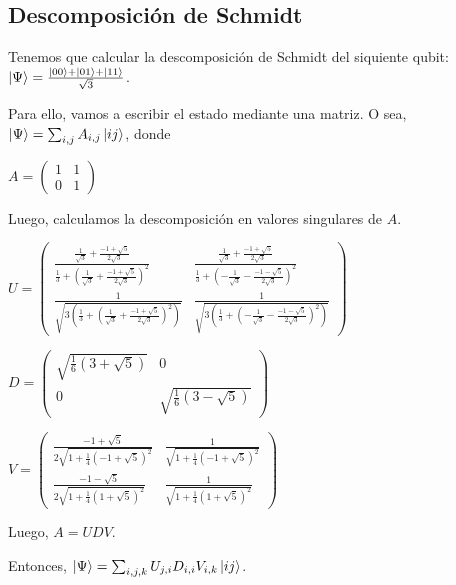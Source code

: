\documentclass[a4paper,11pt]{article}
\begin{document}
\subsection*{Descomposición de Schmidt}

Tenemos que calcular la descomposición de Schmidt del siquiente qubit:
$\left\vert{\Psi}\right\rangle = \frac{\left\vert{00}\right\rangle + \left\vert{01}\right\rangle + \left\vert{11}\right\rangle}{\sqrt{3}}$.

Para ello, vamos a escribir el estado mediante una matriz.
O sea, $\left\vert{\Psi}\right\rangle = \sum_{i,j} A_{i,j} \left\vert{ij}\right\rangle$, donde

$A = 
\begin{pmatrix}
1 & 1\\ 
0 & 1
\end{pmatrix}
$

Luego, calculamos la descomposición en valores singulares de $A$.

$
U =
\begin{pmatrix}
\frac{\frac{1}{\sqrt{3}} + \frac{-1+\sqrt{5}}{2\sqrt{3}}}{\frac{1}{3}+
\left ( \frac{1}{\sqrt{3}} + \frac{-1 + \sqrt{5}}{2\sqrt{3}} \right)^2}  & 
\frac{\frac{1}{\sqrt{3}} + \frac{-1+\sqrt{5}}{2\sqrt{3}}}{\frac{1}{3}+
\left ( -\frac{1}{\sqrt{3}} - \frac{-1 - \sqrt{5}}{2\sqrt{3}} \right)^2}  \\ 
\frac{1}{\sqrt{3 \left ( \frac{1}{3} + \left ( \frac{1}{\sqrt{3}} + 
\frac{-1 + \sqrt{5}}{2\sqrt{3}}\right )^2\right )}} & 
\frac{1}{\sqrt{3 \left ( \frac{1}{3} + \left ( - \frac{1}{\sqrt{3}} - 
\frac{-1 - \sqrt{5}}{2\sqrt{3}}\right )^2\right )}}
\end{pmatrix}$

$
D =
\begin{pmatrix}
\sqrt{\frac{1}{6}\left ( 3 + \sqrt{5} \right )}
& 0
\\ 
0
& \sqrt{\frac{1}{6}\left ( 3 - \sqrt{5} \right )}
\end{pmatrix}
$

$V = 
\begin{pmatrix}
\frac{-1 + \sqrt{5}}{2\sqrt{1 + \frac{1}{4}\left ( -1 + \sqrt{5}\right )^2}} 
& 
\frac{1}{\sqrt{1 + \frac{1}{4}\left ( -1 + \sqrt{5}\right )^2}} \\
\frac{-1 - \sqrt{5}}{2\sqrt{1 + \frac{1}{4}\left ( 1 + \sqrt{5}\right )^2}} 
& \frac{1}{\sqrt{1 + \frac{1}{4}\left ( 1 + \sqrt{5}\right )^2}} 
\end{pmatrix}$

Luego, $A = U D V$.

Entonces, $\left\vert{\Psi}\right\rangle = \sum_{i,j,k} U_{j,i} D_{i,i} V_{i,k}\left\vert{ij}\right\rangle$.
\end{document}
